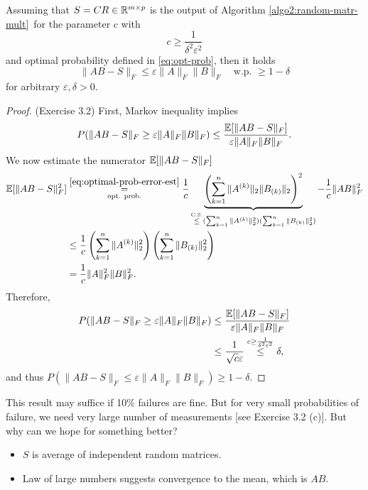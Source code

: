 \begin{remark*}
Assuming that $S=CR \in \mathbb{R}^{m\times p}$ is the output of Algorithm \ref{algo2:random-matr-mult}\ for the parameter $c$ with $$c\geq \frac{1}{\delta^2\varepsilon^2}$$ and optimal probability defined in \eqref{eq:opt-prob}, then it holds 
\begin{equation} \label{eq:error-bound-epsilon-f}
\|AB-S\|_F \leq \varepsilon \|A\|_F \|B\|_F\quad \text{w.p. } \geq 1 - \delta
\end{equation}
for arbitrary $\varepsilon,\delta>0$.
\begin{small} 
\begin{proof}(Exercise 3.2) First, Markov inequality implies
$$
P(\|AB-S\|_F \geq \varepsilon \|A\|_F \|B\|_F) \leq \frac{\mathbb{E} [\|AB-S\|_F]}{\varepsilon \|A\|_F\|B\|_F}.
$$
We now estimate the numerator $\mathbb{E} [\|AB-S\|_F]$
\begin{equation*}
\begin{split}
\mathbb{E}[\|AB-S\|_F^2] & \underset{\text{opt. prob.}}{\overset{\eqref{eq:optimal-prob-error-est}}{=}} \frac{1}{c} \underbrace{\left( \sum_{k=1}^n \|A^{(k)}\|_2 \|B_{(k)}\|_2\right)^2}_{\overset{\text{C.S.}}{\leq}
(\sum_{k=1}^n \|A^{(k)}\|_2^2)(\sum_{k=1}^n \|B_{(k)}\|_2^2)
}- \frac{1}{c} \|AB\|_F^2 \\
& \leq \frac{1}{c} \left(\sum_{k=1}^n \|A^{(k)}\|_2^2\right)\left(\sum_{k=1}^n \|B_{(k)}\|_2^2\right)  \\
& = \frac{1}{c}\|A\|_F^2 \|B\|_F^2.
\end{split}
\end{equation*}
Therefore,
\begin{equation*}
\begin{split}
P(\|AB-S\|_F \geq \varepsilon \|A\|_F \|B\|_F) &\leq \frac{\mathbb{E} [\|AB-S\|_F]}{\varepsilon \|A\|_F\|B\|_F} \\
&\leq \frac{1}{\sqrt{c}\varepsilon} \overset{c \geq \frac{1}{\delta^2\varepsilon^2}}{\leq} \delta,
\end{split}
\end{equation*}
and  thus $P(\|AB-S\|_F \leq \varepsilon \|A\|_F \|B\|_F) \geq 1-\delta$.
\end{proof}
\end{small}
\end{remark*}
This result may suffice if 10\% failures are fine. But for very small probabilities of failure, we need very large number of measurements [see Exercise 3.2 (c)].
But why can we hope for something better?%
\begin{itemize}[itemsep=0pt]
	\item $S$ is average of independent random matrices.
	\item Law of large numbers suggests convergence to the mean, which is $AB$. 
\end{itemize}
